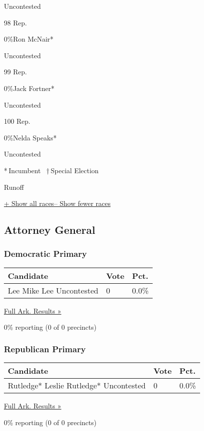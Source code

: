 Uncontested

98 Rep.

 0\%Ron McNair*

Uncontested

99 Rep.

 0\%Jack Fortner*

Uncontested

100 Rep.

 0\%Nelda Speaks*

Uncontested

* Incumbent~ † Special Election

 Runoff

\protect\hyperlink{}{+ Show all races-- Show fewer races}

\hypertarget{attorney-general}{%
\subsection{Attorney General}\label{attorney-general}}

\hypertarget{democratic-primary-6}{%
\subsubsection{Democratic Primary}\label{democratic-primary-6}}

\begin{longtable}[]{@{}lll@{}}
\toprule
Candidate & Vote & Pct.\tabularnewline
\midrule
\endhead
 Lee Mike Lee Uncontested & 0 & 0.0\%\tabularnewline
\bottomrule
\end{longtable}

\href{https://www.nytimes3xbfgragh.onion/elections/results/arkansas}{Full
Ark. Results »}

0\% reporting (0 of 0 precincts)

\hypertarget{republican-primary-6}{%
\subsubsection{Republican Primary}\label{republican-primary-6}}

\begin{longtable}[]{@{}lll@{}}
\toprule
Candidate & Vote & Pct.\tabularnewline
\midrule
\endhead
 Rutledge* Leslie Rutledge* Uncontested & 0 & 0.0\%\tabularnewline
\bottomrule
\end{longtable}

\href{https://www.nytimes3xbfgragh.onion/elections/results/arkansas}{Full
Ark. Results »}

0\% reporting (0 of 0 precincts)

